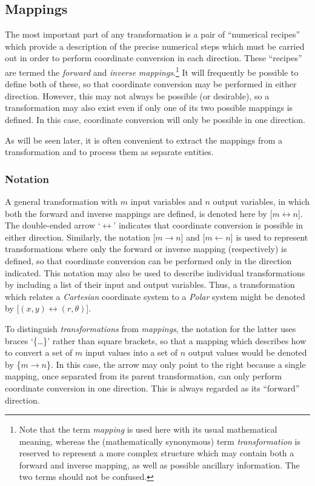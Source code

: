 \documentclass[twoside,nolof,11pt]{starlink}
\begin{document}
\subsection{Mappings}

The most important part of any transformation is a pair of ``numerical
recipes'' which provide a description of the precise numerical steps which
must be carried out in order to perform coordinate conversion in each
direction.
These ``recipes'' are termed the \emph{forward} and \emph{inverse}
\emph{mappings}.\footnote{
Note that the term \emph{mapping} is used here with its usual mathematical
meaning, whereas the (mathematically synonymous) term \emph{transformation}
is reserved to represent a more complex structure which may contain both a
forward and inverse mapping, as well as possible ancillary information.
The two terms should not be confused.}
It will frequently be possible to define both of these, so that coordinate
conversion may be performed in either direction.
However, this may not always be possible (or desirable), so a transformation
may also exist even if only one of its two possible mappings is defined.
In this case, coordinate conversion will only be possible in one direction.

As will be seen later, it is often convenient to extract the mappings from
a transformation and to process them as separate entities.


\subsubsection{Notation}
A general transformation with $m$ input variables and $n$ output variables,
in which both the forward and inverse mappings are defined, is denoted here
by \mbox{[$m \leftrightarrow n$]}.
The double-ended arrow `$\leftrightarrow$' indicates that coordinate
conversion is possible in either direction.
Similarly, the notation \mbox{[$m \rightarrow n$]} and \mbox{[$m \leftarrow
n$]} is used to represent transformations where only the forward or inverse
mapping (respectively) is defined, so that coordinate conversion can be
performed only in the direction indicated.
This notation may also be used to describe individual transformations by
including a list of their input and output variables.
Thus, a transformation which relates a \emph{Cartesian} coordinate system to
a \emph{Polar} system might be denoted by \mbox{[$(x,y) \leftrightarrow
(r,\theta)$]}.

To distinguish \emph{transformations} from \emph{mappings}, the notation for
the latter uses braces `\{\ldots\}' rather than square brackets, so that a
mapping which describes how to convert a set of $m$ input values into a set
of $n$ output values would be denoted by \mbox{\{$m \rightarrow n$\}}.
In this case, the arrow may only point to the right because a single
mapping, once separated from its parent transformation, can only perform
coordinate conversion in one direction.
This is always regarded as its ``forward'' direction.
\end{document}

